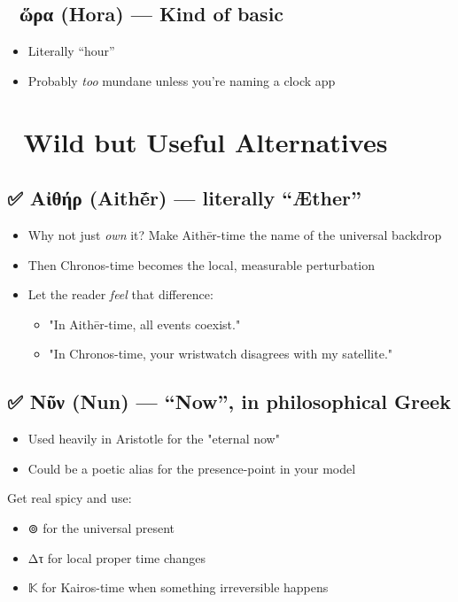 \documentclass[12pt]{article}
\begin{document}
\subsection*{🚫 ὥρα (Hora) — Kind of basic}
\begin{itemize}
\item Literally “hour”
\item Probably \textit{too} mundane unless you’re naming a clock app
\end{itemize}


\section*{🧠 Wild but Useful Alternatives}
\subsection*{✅ Αἰθήρ (Aithḗr) — literally “Æther”}
\begin{itemize}
\item Why not just \textit{own} it? Make Aithēr-time the name of the universal backdrop
\item Then Chronos-time becomes the local, measurable perturbation
\item Let the reader \textit{feel} that difference:
\begin{itemize}
\item "In Aithēr-time, all events coexist."
\item "In Chronos-time, your wristwatch disagrees with my satellite."
\end{itemize}\end{itemize}

\subsection*{✅ Νῦν (Nun) — “Now”, in philosophical Greek}
\begin{itemize}
\item Used heavily in Aristotle for the "eternal now"
\item Could be a poetic alias for the presence-point in your model
\end{itemize}




Get real spicy and use:


\begin{itemize}
\item ⊚ for the universal present
\item Δτ for local proper time changes
\item 𝕂 for Kairos-time when something irreversible happens
\end{itemize}
\end{document}
